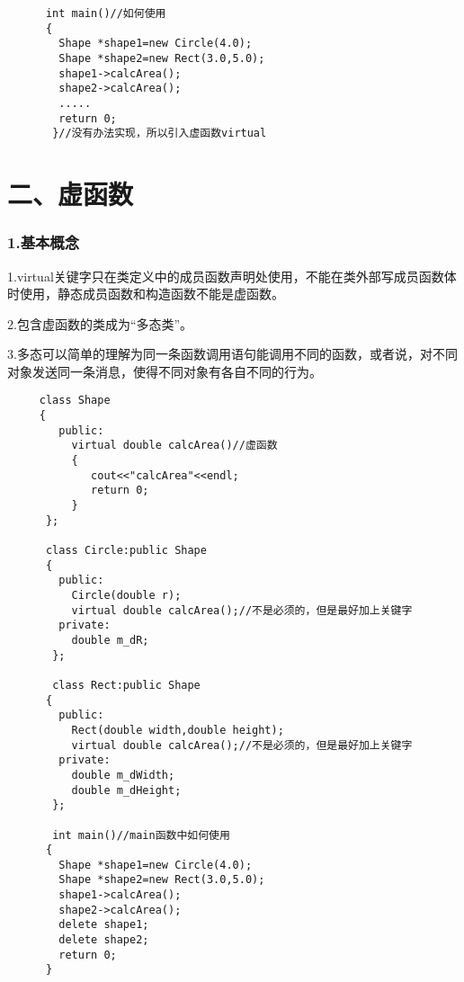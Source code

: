 \documentclass{article}
\begin{document}
\begin{CJK}{UTF8}{gbsn}
\begin{verbatim}
      int main()//如何使用
      {
        Shape *shape1=new Circle(4.0);
        Shape *shape2=new Rect(3.0,5.0);
        shape1->calcArea();
        shape2->calcArea();
        .....
        return 0;
       }//没有办法实现，所以引入虚函数virtual
\end{verbatim}
\part*{二、虚函数}
\section*{1.基本概念}
\subparagraph*{}
1.virtual关键字只在类定义中的成员函数声明处使用，不能在类外部写成员函数体时使用，静态成员函数和构造函数不能是虚函数。
\subparagraph*{}
2.包含虚函数的类成为“多态类”。
\subparagraph*{}
3.多态可以简单的理解为同一条函数调用语句能调用不同的函数，或者说，对不同对象发送同一条消息，使得不同对象有各自不同的行为。
\begin{verbatim}
     class Shape
     {
        public:
          virtual double calcArea()//虚函数
          {
             cout<<"calcArea"<<endl;
             return 0;
          }
      };
      
      class Circle:public Shape
      {
        public:
          Circle(double r);
          virtual double calcArea();//不是必须的，但是最好加上关键字
        private:
          double m_dR;
       };
       
       class Rect:public Shape
      {
        public:
          Rect(double width,double height);
          virtual double calcArea();//不是必须的，但是最好加上关键字
        private:
          double m_dWidth;
          double m_dHeight;
       };
       
       int main()//main函数中如何使用
      {
        Shape *shape1=new Circle(4.0);
        Shape *shape2=new Rect(3.0,5.0);
        shape1->calcArea();
        shape2->calcArea();
        delete shape1;
        delete shape2;
        return 0;
      }
\end{verbatim}

\end{CJK}
\end{document}

